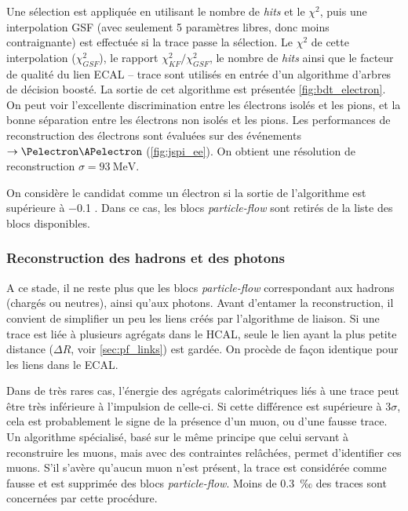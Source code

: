 Une sélection est appliquée en utilisant le nombre de \emph{hits} et le $\chi^2$, puis une interpolation GSF (avec seulement 5 paramètres libres, donc moins contraignante) est effectuée si la trace passe la sélection. Le $\chi^2$ de cette interpolation ($\chi^2_{GSF}$), le rapport $\chi^2_{KF} / \chi^2_{GSF}$, le nombre de \emph{hits} ainsi que le facteur de qualité du lien ECAL -- trace sont utilisés en entrée d'un algorithme d'arbres de décision boosté. La sortie de cet algorithme est présentée \cref{fig:bdt_electron}. On peut voir l'excellente discrimination entre les électrons isolés et les pions, et la bonne séparation entre les électrons non isolés et les pions. Les performances de reconstruction des électrons sont évaluées sur des événements \PJpsi $\rightarrow \Pelectron \APelectron$ (\cref{fig:jspi_ee}). On obtient une résolution de reconstruction $\sigma = \SI{93}{\MeV}$.

On considère le candidat comme un électron si la sortie de l'algorithme est supérieure à \num{-0.1} \citep{cms_pf_electrons}. Dans ce cas, les blocs \emph{particle-flow} sont retirés de la liste des blocs disponibles.

\subsubsection{Reconstruction des hadrons et des photons}

A ce stade, il ne reste plus que les blocs \emph{particle-flow} correspondant aux hadrons (chargés ou neutres), ainsi qu'aux photons. Avant d'entamer la reconstruction, il convient de simplifier un peu les liens créés par l'algorithme de liaison. Si une trace est liée à plusieurs agrégats dans le HCAL, seule le lien ayant la plus petite distance ($\Delta R$, voir \cref{sec:pf_links}) est gardée. On procède de façon identique pour les liens dans le ECAL.

Dans de très rares cas, l'énergie des agrégats calorimétriques liés à une trace peut être très inférieure à l'impulsion de celle-ci. Si cette différence est supérieure à $3\sigma$, cela est probablement le signe de la présence d'un muon, ou d'une fausse trace. Un algorithme spécialisé, basé sur le même principe que celui servant à reconstruire les muons, mais avec des contraintes relâchées, permet d'identifier ces muons. S'il s'avère qu'aucun muon n'est présent, la trace est considérée comme fausse et est supprimée des blocs \emph{particle-flow}. Moins de \SI{0.3}{‰} des traces sont concernées par cette procédure.

